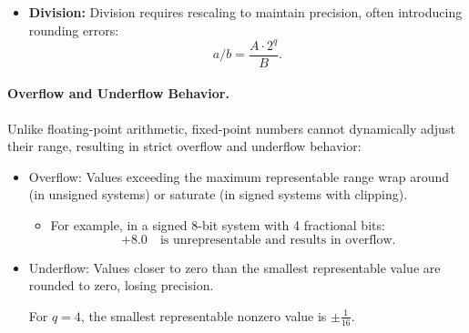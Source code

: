 \begin{itemize}
\begin{enumerate}
    \item Perform 2's complement multiplication:
    \[
    00110010_2 \cdot 00000.100_2 = 0000000011001000_2.
    \]

   \item Shift the result right by $q=3$ bits and retain the lower $n=8$ bits:
    \[
    0000000011001000_2 \rightarrow 0000000011001xxx_2 \rightarrow 00011001_2
    \]

    \item Interpret the number with radix point at $q=3$:
    \[
   00011.001_2
    \]
    This corresponds to \( 3.125 \) in decimal.

\end{enumerate}
    \item \textbf{Division:} Division requires rescaling to maintain precision, often introducing rounding errors:
\[
a / b = \frac{A \cdot 2^q}{B}.
\]
\end{itemize}


\paragraph{Overflow and Underflow Behavior.}
Unlike floating-point arithmetic, fixed-point numbers cannot dynamically adjust their range, resulting in strict overflow and underflow behavior:
\begin{itemize}
    \item Overflow: Values exceeding the maximum representable range wrap around (in unsigned systems) or saturate (in signed systems with clipping). 
    \begin{itemize}[label={}]
        \item For example, in a signed 8-bit system with 4 fractional bits:
\[
+8.0 \quad \text{is unrepresentable and results in overflow.}
\]
    \end{itemize}
    
    \item Underflow: Values closer to zero than the smallest representable value are rounded to zero, losing precision.  
    
    For \( q = 4 \), the smallest representable nonzero value is \( \pm \frac{1}{16} \).

\end{itemize}

